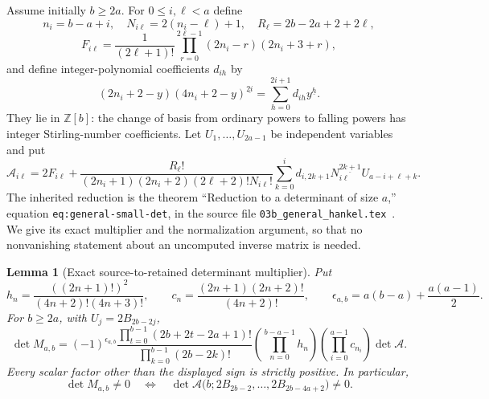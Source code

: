 \documentclass[11pt,a4paper]{article}
\numberwithin{equation}{section}
\theoremstyle{plain}
\newtheorem{lemma}[theorem]{Lemma}
\theoremstyle{definition}
\theoremstyle{remark}
\begin{document}
Assume initially $b\ge2a$. For $0\le i,\ell<a$ define
\[
 n_i=b-a+i,\quad N_{i\ell}=2(n_i-\ell)+1,\quad
 R_\ell=2b-2a+2+2\ell,
\]
\[
 F_{i\ell}=\frac1{(2\ell+1)!}
 \prod_{r=0}^{2\ell-1}(2n_i-r)(2n_i+3+r),
\]
and define integer-polynomial coefficients $d_{ih}$ by
\begin{equation}\label{ert:newton}
 (2n_i+2-y)(4n_i+2-y)^{\underline{2i}}
       =\sum_{h=0}^{2i+1}d_{ih}y^{\underline h}.
\end{equation}
They lie in $\mathbb Z[b]$: the change of basis from ordinary
powers to falling powers has integer Stirling-number coefficients.
Let $U_1,\ldots,U_{2a-1}$ be independent variables and put
\begin{equation}\label{ert:A}
 \mathcal A_{i\ell}=2F_{i\ell}+
 \frac{R_\ell!}
 {(2n_i+1)(2n_i+2)(2\ell+2)!N_{i\ell}!}
 \sum_{k=0}^{i}d_{i,2k+1}N_{i\ell}^{\underline{2k+1}}
            U_{a-i+\ell+k}.
\end{equation}
The inherited reduction is the theorem ``Reduction to a determinant
of size $a$,'' equation \texttt{eq:general-small-det}, in the source
file \texttt{03b\_general\_hankel.tex}~\cite{GeneralHankel}.
We give its exact multiplier and the normalization argument, so
that no nonvanishing statement about an uncomputed inverse matrix
is needed.

\begin{lemma}[Exact source-to-retained determinant multiplier]
\label{ert:normalization}
Put
\[
 h_n=\frac{((2n+1)!)^2}{(4n+2)!(4n+3)!},\qquad
 c_n=\frac{(2n+1)(2n+2)!}{(4n+2)!},
 \qquad \epsilon_{a,b}=a(b-a)+\frac{a(a-1)}2.
\]
For $b\ge2a$, with $U_j=2B_{2b-2j}$,
\begin{equation}\label{ert:exact-multiplier}
 \det M_{a,b}=(-1)^{\epsilon_{a,b}}
 \frac{\prod_{t=0}^{b-1}(2b+2t-2a+1)!}
      {\prod_{k=0}^{b-1}(2b-2k)!}
 \left(\prod_{n=0}^{b-a-1}h_n\right)
 \left(\prod_{i=0}^{a-1}c_{n_i}\right)\det\mathcal A.
\end{equation}
Every scalar factor other than the displayed sign is strictly
positive. In particular,
\begin{equation}\label{ert:equivalence}
 \det M_{a,b}\ne0
 \quad\Longleftrightarrow\quad
 \det\mathcal A\bigl(b;2B_{2b-2},\ldots,2B_{2b-4a+2}\bigr)\ne0.
\end{equation}
\end{lemma}
\end{document}
